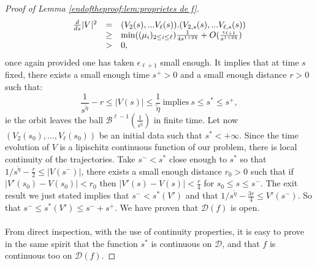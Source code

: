 \documentclass[11pt,a4paper,reqno]{amsart}
\theoremstyle{remark}
\numberwithin{equation}{section}
\begin{document}
\begin{proof}[Proof of Lemma \ref{endoftheproof:lem:proprietes de f}]
$$
\begin{array}{r c l}
\frac{d}{ds}|V|^2&=&(V_2(s),...V_{\ell}(s)).(V_{2,s}(s),...V_{\ell,s}(s)) \\
&\geq& \text{min}((\mu_i)_{2\leq i \leq \ell})\frac{1}{4s^{1+2\tilde{\eta}}} +O(\frac{\epsilon_{\ell+1}}{s^{1+2\tilde{\eta}}} ) \\
&>&0 ,
\end{array}
$$
once again provided one has taken $\epsilon_{\ell+1}$ small enough. It implies that at time $s$ fixed, there exists a small enough time $s^+>0$ and a small enough distance $r>0$ such that:
$$
\frac{1}{s^{\tilde{\eta}}}-r\leq |V(s)| \leq \frac{1}{\tilde{\eta}} \ \text{implies} \ s\leq s^* \leq s^+ ,
$$
ie the orbit leaves the ball $\mathcal{B}^{\ell-1}(\frac{1}{s^{\tilde{\eta}}})$ in finite time. Let now $(V_2(s_0),...,V_{\ell}(s_0))$ be an initial data such that $s^*<+\infty$. Since the time evolution of $V$ is a lipischitz continuous function of our problem, there is local continuity of the trajectories. Take $s^-<s^*$ close enough to $s^*$ so that $1/s^{\tilde{\eta}}-\frac{r}{2}\leq|V(s^-)|$, there exists a small enough distance $r_0>0$ such that if $|V'(s_0)-V(s_0)|<r_0$ then $|V'(s)-V(s)|<\frac{r}{4}$ for $s_0\leq s \leq s^-$. The exit result we just stated implies that $s^-<s^*(V')$ and that $1/s^{\tilde{\eta}}-\frac{3r}{4}\leq V'(s^-)$. So that $s^-\leq s^*(V') \leq s^-+s^+$. We have proven that $\mathcal{D}(f)$ is open.\\
\\
From direct inspection, with the use of continuity properties, it is easy to prove in the same spirit that the function $s^*$ is continuous on $\mathcal{D}$, and that $f$ is continuous too on $\mathcal{D}(f)$.
\end{proof}
\end{document}
